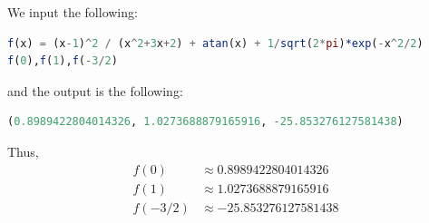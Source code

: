 \documentclass[12pt,answers]{book}
\begin{document}
\vspace{1cm}
We input the following:
\begin{lstlisting}[language=Julia]
f(x) = (x-1)^2 / (x^2+3x+2) + atan(x) + 1/sqrt(2*pi)*exp(-x^2/2)
f(0),f(1),f(-3/2)
\end{lstlisting}
and the output is the following:
\begin{lstlisting}[language=Julia]
(0.8989422804014326, 1.0273688879165916, -25.853276127581438)
\end{lstlisting}
Thus,
\begin{align*}
  f(0) &\approx 0.8989422804014326\\
  f(1) &\approx 1.0273688879165916\\
  f(-3/2) &\approx -25.853276127581438\\
\end{align*}
\end{document}
